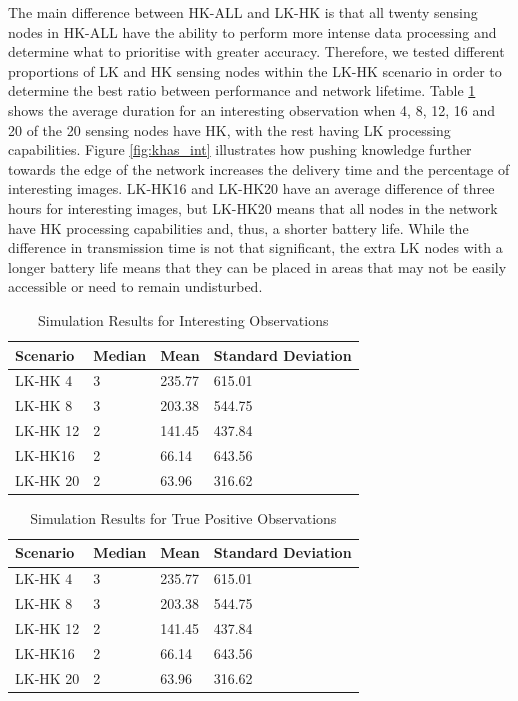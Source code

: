 The main difference between HK-ALL and LK-HK is that all twenty sensing nodes in HK-ALL have the ability to perform more intense data processing and determine what to prioritise with greater accuracy. Therefore, we tested different proportions of LK and HK sensing nodes within the LK-HK scenario in order to determine the best ratio between performance and network lifetime. Table \ref{tab:khas_int} shows the average duration for an interesting observation when 4, 8, 12, 16 and 20 of the 20 sensing nodes have HK, with the rest having LK processing capabilities. Figure \ref{fig:khas_int} illustrates how pushing knowledge further towards the edge of the network increases the delivery time and the percentage of interesting images. LK-HK16 and LK-HK20 have an average difference of three hours for interesting images, but LK-HK20 means that all nodes in the network have HK processing capabilities and, thus, a shorter battery life. While the difference in transmission time is not that significant, the extra LK nodes with a longer battery life means that they can be placed in areas that may not be easily accessible or need to remain undisturbed.

\begin{table}[h]\footnotesize
\begin{tabularx}{\textwidth}{ |X|X|X|X|}
\hline
Scenario & Median & Mean & Standard Deviation \\
\hline
LK-HK 4 & 3 & 235.77 & 615.01 \\
LK-HK 8 & 3 & 203.38 & 544.75 \\
LK-HK 12 & 2 & 141.45 & 437.84 \\
LK-HK16 & 2 & 66.14 & 643.56 \\
LK-HK 20 & 2 & 63.96 & 316.62 \\
\hline
\end{tabularx}
\caption{Simulation Results for Interesting Observations}\label{tab:khas_int}
\end{table}

\begin{table}[h]\footnotesize
\begin{tabularx}{\textwidth}{ |X|X|X|X|}
\hline
Scenario & Median & Mean & Standard Deviation \\
\hline
LK-HK 4 & 3 & 235.77 & 615.01 \\
LK-HK 8 & 3 & 203.38 & 544.75 \\
LK-HK 12 & 2 & 141.45 & 437.84 \\
LK-HK16 & 2 & 66.14 & 643.56 \\
LK-HK 20 & 2 & 63.96 & 316.62 \\
\hline
\end{tabularx}
\caption{Simulation Results for True Positive Observations}\label{tab:khas_tp}
\end{table}

